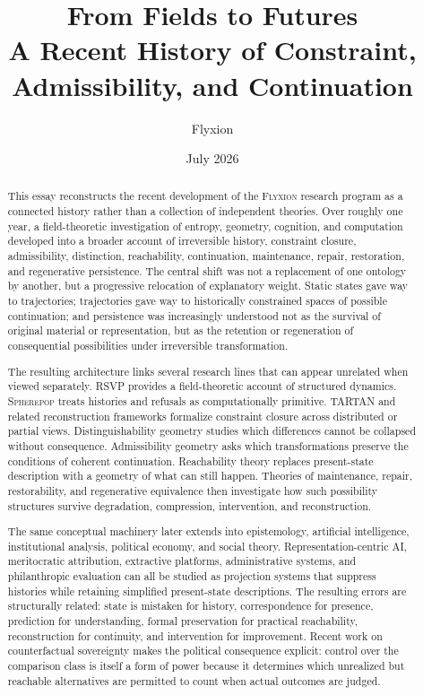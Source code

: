 \documentclass[11pt]{article}
\title{
  \textbf{From Fields to Futures}\\[0.4em]
  \large A Recent History of Constraint, Admissibility, and Continuation
}
\author{Flyxion}
\date{July 2026}
\theoremstyle{remark}
\newcommand{\RSVP}{\textsc{RSVP}}
\newcommand{\TARTAN}{\textsc{TARTAN}}
\newcommand{\Flyxion}{\textsc{Flyxion}}
\newcommand{\Spherepop}{\textsc{Spherepop}}
\begin{document}
\maketitle

\begin{abstract}

This essay reconstructs the recent development of the \Flyxion{} research program as a connected history rather than a collection of independent theories. Over roughly one year, a field-theoretic investigation of entropy, geometry, cognition, and computation developed into a broader account of irreversible history, constraint closure, admissibility, distinction, reachability, continuation, maintenance, repair, restoration, and regenerative persistence. The central shift was not a replacement of one ontology by another, but a progressive relocation of explanatory weight. Static states gave way to trajectories; trajectories gave way to historically constrained spaces of possible continuation; and persistence was increasingly understood not as the survival of original material or representation, but as the retention or regeneration of consequential possibilities under irreversible transformation.

The resulting architecture links several research lines that can appear unrelated when viewed separately. \RSVP{} provides a field-theoretic account of structured dynamics. \Spherepop{} treats histories and refusals as computationally primitive. \TARTAN{} and related reconstruction frameworks formalize constraint closure across distributed or partial views. Distinguishability geometry studies which differences cannot be collapsed without consequence. Admissibility geometry asks which transformations preserve the conditions of coherent continuation. Reachability theory replaces present-state description with a geometry of what can still happen. Theories of maintenance, repair, restorability, and regenerative equivalence then investigate how such possibility structures survive degradation, compression, intervention, and reconstruction.

The same conceptual machinery later extends into epistemology, artificial intelligence, institutional analysis, political economy, and social theory. Representation-centric AI, meritocratic attribution, extractive platforms, administrative systems, and philanthropic evaluation can all be studied as projection systems that suppress histories while retaining simplified present-state descriptions. The resulting errors are structurally related: state is mistaken for history, correspondence for presence, prediction for understanding, formal preservation for practical reachability, reconstruction for continuity, and intervention for improvement. Recent work on counterfactual sovereignty makes the political consequence explicit: control over the comparison class is itself a form of power because it determines which unrealized but reachable alternatives are permitted to count when actual outcomes are judged.


\end{abstract}
\end{document}
